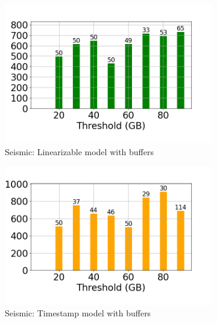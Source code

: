 \begin{figure}
	\centering
	\begin{subfigure}[c]{0.48\textwidth}
		\includegraphics[width=1\textwidth]   {figures/Experiments/Dynamic/SEISMIC/25/average_query_time_per_batch_version_999777015_10485760_10_delay[25].png}
		\caption{Seismic: Linearizable model with buffers}
		\label{fig:logical-ts-25-seismic}
	\end{subfigure}
	\begin{subfigure}[c]{0.48\textwidth}
		\includegraphics[width=1\textwidth]	 {figures/Experiments/Dynamic/SEISMIC/25/average_query_time_per_batch_version_999777018_10485760_10_delay[25].png}
		\caption{Seismic: Timestamp model with buffers}
		\label{fig:system-ts-25-seismic}
	\end{subfigure}
	\begin{subfigure}[c]{0.48\textwidth}

\end{subfigure}
\end{figure}

